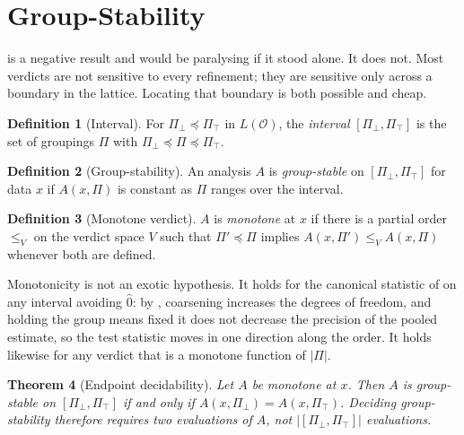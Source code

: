 \documentclass[11pt,a4paper]{article}
\newtheorem{theorem}{Theorem}[section]
\theoremstyle{definition}
\newtheorem{definition}[theorem]{Definition}
\theoremstyle{remark}
\newcommand{\Obs}{\mathcal{O}}               %
\newcommand{\Part}{\Pi}                      %
\begin{document}
\section{Group-Stability}
\label{sec:stability}

 is a negative result and would be paralysing
if it stood alone. It does not. Most verdicts are not sensitive to every
refinement; they are sensitive only across a boundary in the lattice.
Locating that boundary is both possible and cheap.

\begin{definition}[Interval]\label{def:interval}
For $\Part_{\bot} \preceq \Part_{\top}$ in $L(\Obs)$, the \emph{interval}
$[\Part_{\bot},\Part_{\top}]$ is the set of groupings $\Part$ with
$\Part_{\bot} \preceq \Part \preceq \Part_{\top}$.
\end{definition}

\begin{definition}[Group-stability]\label{def:stable}
An analysis $A$ is \emph{group-stable} on $[\Part_{\bot},\Part_{\top}]$
for data $x$ if $A(x,\Part)$ is constant as $\Part$ ranges over the
interval.
\end{definition}

\begin{definition}[Monotone verdict]\label{def:monotone}
$A$ is \emph{monotone} at $x$ if there is a partial order $\leq_V$ on the
verdict space $V$ such that $\Part' \preceq \Part$ implies
$A(x,\Part') \leq_V A(x,\Part)$ whenever both are defined.
\end{definition}

Monotonicity is not an exotic hypothesis. It holds for the canonical
statistic of  on any interval avoiding $\hat{0}$: by
, coarsening increases the degrees of freedom, and holding
the group means fixed it does not decrease the precision of the pooled
estimate, so the test statistic moves in one direction along the order.
It holds likewise for any verdict that is a monotone function of
$|\Part|$.

\begin{theorem}[Endpoint decidability]\label{thm:endpoints}
Let $A$ be monotone at $x$. Then $A$ is group-stable on
$[\Part_{\bot},\Part_{\top}]$ if and only if
$A(x,\Part_{\bot}) = A(x,\Part_{\top})$. Deciding group-stability
therefore requires two evaluations of $A$, not
$|[\Part_{\bot},\Part_{\top}]|$ evaluations.
\end{theorem}
\end{document}
